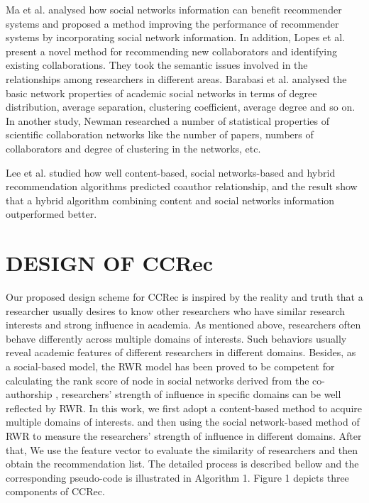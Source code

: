 \documentclass{acm_proc_article-sp}
\begin{document}
Ma et al. analysed how social networks information can benefit recommender systems and proposed a method improving the performance of recommender systems by incorporating social network information. In addition, Lopes et al. present a novel method for recommending new collaborators and identifying existing collaborations. They took the semantic issues involved in the relationships among researchers in different areas. Barabasi et al. analysed the basic network properties of academic social networks in terms of degree distribution, average separation, clustering coefficient, average degree and so on. In another study, Newman researched a number of statistical properties of scientific collaboration networks like the number of papers, numbers of collaborators and degree of clustering in the networks, etc.

Lee et al. studied how well content-based, social networks-based and hybrid recommendation algorithms predicted coauthor relationship, and the result show that a hybrid algorithm combining content and social networks information outperformed better.
\section{DESIGN OF CCRec}
Our proposed design scheme for CCRec is inspired by the reality and truth that a researcher usually desires to know other researchers who have similar research interests and strong influence in academia. As mentioned above, researchers often behave differently across multiple domains of interests. Such behaviors usually reveal academic features of different researchers in different domains. Besides, as a social-based model, the RWR model has been proved to be competent for calculating the rank score of node in social networks derived from the co-authorship \cite{li2014acrec}, researchers' strength of influence in specific domains can be well reflected by RWR. In this work, we first adopt a content-based method to acquire multiple domains of interests. and then using the social network-based method of RWR to measure the researchers' strength of influence in different domains. After that, We use the feature vector to evaluate the similarity of researchers and then obtain the recommendation list. The detailed process is described bellow and the corresponding pseudo-code is illustrated in Algorithm 1. Figure 1 depicts three components of CCRec.
\end{document}
